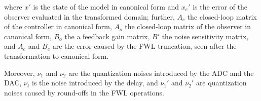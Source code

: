 \documentclass[sigconf]{llncs}
\newcommand{\mat}[1]{{#1}}
\renewcommand{\vec}[1]{{#1}}
\begin{document}
%
where $\vec{x}'$ is the state of the model in canonical form and
$\vec{x}_e'$ is the error of the observer evaluated in the transformed
domain; further, $\mat{A}_{c}$ the closed-loop matrix of the controller in
canonical form, $\mat{A}_{o}$ the closed-loop matrix of the observer in
canonical form, $\mat{B}_{o}$ the a feedback gain matrix, $\mat{B}'$ the
noise sensitivity matrix, and $\mat{A}_{e}$ and $\mat{B}_{e}$ are the error
caused by the FWL truncation, seen after the transformation to canonical
form.

%
Moreover, $\nu_1$ and $\nu_2$ are the quantization noises introduced by the
ADC and the DAC, $\nu_t$ is the noise introduced by the delay, and $\nu_1'$
and $\nu_2'$ are quantization noises caused by round-offs in the FWL
operations.
\end{document}

